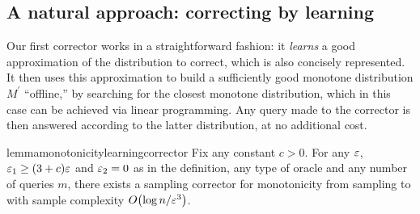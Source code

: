 \subsection{A natural approach: correcting by learning}\label{sec:monotonicity}
Our first corrector works in a straightforward fashion: 
it \emph{learns} a good approximation of the distribution to correct,
which is also concisely represented.   
It then uses this approximation to 
build a sufficiently good monotone distribution $M^\prime$ ``offline,''
by searching for the closest monotone distribution, which in
this case can be achieved via linear programming.
Any query made to the corrector is then answered according to the latter distribution, at no additional cost.
\begin{restatable}{lemma}{monotonicitylearningcorrector} \label{lemma:learning:corrector:birge}
  Fix any constant $c>0$. For any $\varepsilon$, $\varepsilon_1 \geq (3+c)\varepsilon$ and $\varepsilon_2=0$ as in the definition, any type of oracle \ORACLE and any number of queries $m$, there exists a sampling corrector for monotonicity from {sampling} to \ORACLE with sample complexity $\bigO{\log n/\eps^3}$.
\end{restatable}
